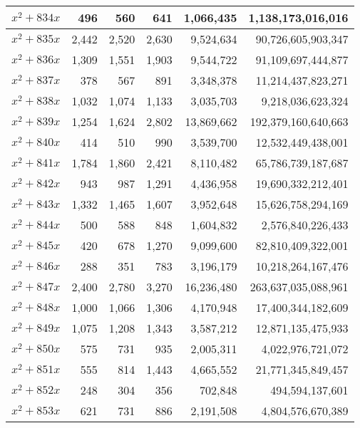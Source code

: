 \documentclass[a4paper]{amsproc}
\theoremstyle{plain}
\theoremstyle{named}
\begin{document}
\begin{longtable}{ | l | r | r | r | r | r | }
$x^2 + 834x$ & 496 & 560 & 641 & 1{,}066{,}435 & 1{,}138{,}173{,}016{,}016 \\ \hline
$x^2 + 835x$ & 2{,}442 & 2{,}520 & 2{,}630 & 9{,}524{,}634 & 90{,}726{,}605{,}903{,}347 \\ \hline
$x^2 + 836x$ & 1{,}309 & 1{,}551 & 1{,}903 & 9{,}544{,}722 & 91{,}109{,}697{,}444{,}877 \\ \hline
$x^2 + 837x$ & 378 & 567 & 891 & 3{,}348{,}378 & 11{,}214{,}437{,}823{,}271 \\ \hline
$x^2 + 838x$ & 1{,}032 & 1{,}074 & 1{,}133 & 3{,}035{,}703 & 9{,}218{,}036{,}623{,}324 \\ \hline
$x^2 + 839x$ & 1{,}254 & 1{,}624 & 2{,}802 & 13{,}869{,}662 & 192{,}379{,}160{,}640{,}663 \\ \hline
$x^2 + 840x$ & 414 & 510 & 990 & 3{,}539{,}700 & 12{,}532{,}449{,}438{,}001 \\ \hline
$x^2 + 841x$ & 1{,}784 & 1{,}860 & 2{,}421 & 8{,}110{,}482 & 65{,}786{,}739{,}187{,}687 \\ \hline
$x^2 + 842x$ & 943 & 987 & 1{,}291 & 4{,}436{,}958 & 19{,}690{,}332{,}212{,}401 \\ \hline
$x^2 + 843x$ & 1{,}332 & 1{,}465 & 1{,}607 & 3{,}952{,}648 & 15{,}626{,}758{,}294{,}169 \\ \hline
$x^2 + 844x$ & 500 & 588 & 848 & 1{,}604{,}832 & 2{,}576{,}840{,}226{,}433 \\ \hline
$x^2 + 845x$ & 420 & 678 & 1{,}270 & 9{,}099{,}600 & 82{,}810{,}409{,}322{,}001 \\ \hline
$x^2 + 846x$ & 288 & 351 & 783 & 3{,}196{,}179 & 10{,}218{,}264{,}167{,}476 \\ \hline
$x^2 + 847x$ & 2{,}400 & 2{,}780 & 3{,}270 & 16{,}236{,}480 & 263{,}637{,}035{,}088{,}961 \\ \hline
$x^2 + 848x$ & 1{,}000 & 1{,}066 & 1{,}306 & 4{,}170{,}948 & 17{,}400{,}344{,}182{,}609 \\ \hline
$x^2 + 849x$ & 1{,}075 & 1{,}208 & 1{,}343 & 3{,}587{,}212 & 12{,}871{,}135{,}475{,}933 \\ \hline
$x^2 + 850x$ & 575 & 731 & 935 & 2{,}005{,}311 & 4{,}022{,}976{,}721{,}072 \\ \hline
$x^2 + 851x$ & 555 & 814 & 1{,}443 & 4{,}665{,}552 & 21{,}771{,}345{,}849{,}457 \\ \hline
$x^2 + 852x$ & 248 & 304 & 356 & 702{,}848 & 494{,}594{,}137{,}601 \\ \hline
$x^2 + 853x$ & 621 & 731 & 886 & 2{,}191{,}508 & 4{,}804{,}576{,}670{,}389 \\ \hline

\end{longtable}
\end{document}
